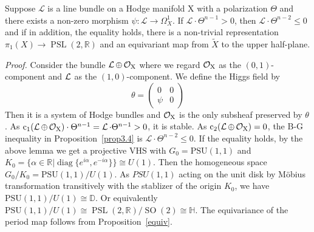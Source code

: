 \documentclass[aspectratio=169, 10pt]{beamer}
\theoremstyle{definition}
\theoremstyle{example}
\begin{document}
	\begin{frame}[allowframebreaks]
		\begin{corollary}
			Suppose $\mathcal{L}$ is a line bundle on a Hodge manifold X with a polarization $\Theta$ and there exists a non-zero morphism $\psi:\mathcal{L}\to \Omega_X^1$. If $\mathcal{L}\cdot \Theta^{n-1}>0$, then $\mathcal{L}\cdot \Theta^{n-2}\leq 0$ and if in addition, the equality holds, there is a non-trivial representation $\pi_1(X)\to \operatorname{PSL}(2,\mathbb{R})$ and an equivariant map from $\widetilde{X}$ to the upper half-plane.
		\end{corollary}
		\noindent \textit{Proof.}
		Consider the bundle $\operatorname{\mathcal{L}}\oplus \operatorname{\mathcal{O}_X}$ where we regard $\operatorname{\mathcal{O}_X}$ as the $(0,1)$-component and $\operatorname{\mathcal{L}}$ as the $(1,0)$-component. We define the Higgs field by 
		\[
			\theta =
			\begin{pmatrix}
			0 & 0 \\
			\psi & 0
			\end{pmatrix}
			\]
		Then it is a system of Hodge bundles and $\operatorname{\mathcal{O}_X}$ is the only subsheaf preserved by $\theta$. As $\operatorname{c}_1(\operatorname{\mathcal{L}}\oplus \operatorname{\mathcal{O}_X})\cdot \Theta^{n-1}=\operatorname{\mathcal{L}}\cdot \Theta^{n-1}>0$, it is stable. As $\operatorname{c}_2(\operatorname{\mathcal{L}}\oplus \operatorname{\mathcal{O}_X})=0$, the B-G inequality in Proposition~\ref{prop3.4} is $\mathcal{L}\cdot \Theta^{n-2}\leq 0$. If the equality holds, by the above lemma we get a projective VHS with $G_0=\operatorname{PSU(1,1)}$ and $K_0=\{\alpha\in \mathbb{R}|\operatorname{diag}\{e^{i\alpha},e^{-i\alpha}\}\}\cong U(1)$. Then the homogeneous space $G_0/K_0=\operatorname{PSU(1,1)}/U(1)$. As $PSU(1,1)$ acting on the unit disk by M\"obius transformation transitively with the stablizer of the origin $K_0$, we have $\operatorname{PSU(1,1)}/U(1)\cong \mathbb{D}$. Or equivalently $\operatorname{PSU(1,1)}/U(1)\cong \operatorname{PSL}(2,\mathbb{R})/\operatorname{SO}(2)\cong \mathbb{H}$. The equivariance of the period map follows from Proposition~\ref{equiv}.


\end{frame}
\end{document}
